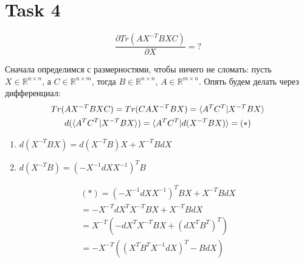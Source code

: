
\section{Task 4}
\begin{task}
    \begin{equation}
        \frac{\partial Tr(AX^{-T}BXC)}{\partial X} = ?
    \end{equation}
\end{task}


\begin{solution}
    Сначала определимся с размерностями, чтобы ничего не сломать: пусть $X \in \mathbb{R}^{n \times n}$, а $C \in \mathbb{R}^{n \times m}$, тогда $B \in \mathbb{R}^{n \times n}$, $A \in \mathbb{R}^{m \times n}$. Опять будем делать через дифференциал:
    \begin{gather}
        Tr(AX^{-T}BXC) = Tr(CAX^{-T}BX) = \braket{A^TC^T | X^{-T}BX} \\
        d(\braket{A^TC^T | X^{-T}BX}) = \braket{A^TC^T | d(X^{-T}BX)} = (*)
    \end{gather}
    \begin{enumerate}
        \item $d(X^{-T}BX) = d(X^{-T}B)X + X^{-T}BdX$
        \item $d(X^{-T} B) = (-X^{-1} dX X^{-1})^T B$
    \end{enumerate}
    \begin{gather}
        (*) = (-X^{-1} dX X^{-1})^T B X + X^{-T} B dX \\
        = -X^{-T} dX^T X^{-T} B X + X^{-T} B dX \\
        = X^{-T} (-dX^T X^{-T} B X + (dX^T B^T)^T) \\
        = -X^{-T}((X^T B^T X^{-1} dX)^T - B dX)
    \end{gather}


\end{solution}
